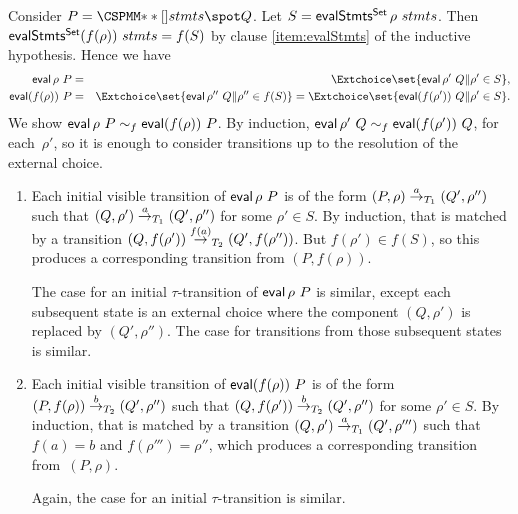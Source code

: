



Consider $P = \M{**[]} stmts \spot Q$.  Let $S = \mathop{\sf evalStmts^{Set}} \rho~stmts$.
Then $\mathop{\sf evalStmts^{Set}} (f(\rho))~stmts = f(S)$ by clause \ref{item:evalStmts} of
the inductive hypothesis.  Hence we have
%
\begin{eqnarray*}
\eval \rho~ P & = & 
  \Extchoice \set{\eval \rho' ~ Q \| \rho' \in S}, \\
\eval (f(\rho))~ P & = & 
  \Extchoice \set{\eval \rho'' ~ Q \| \rho'' \in f(S)} 
   =  \Extchoice \set{\eval (f(\rho'))~ Q \| \rho' \in S} .
\end{eqnarray*}
%
We show $\mathop{\sf eval} \rho~ P \sim_f \mathop{\sf eval} (f(\rho))~ P$.  By
induction, $\mathop{\sf eval} \rho' ~ Q \sim_f \mathop{\sf eval} (f(\rho'))~ Q$, for each~$\rho'$,
so it is enough to consider transitions up to the resolution of the external
choice. 
%
\begin{enumerate}
\item
Each initial visible transition of $\mathop{\sf eval} \rho~ P$ is of the form
$(P,\rho) \stackrel{a}{\rightarrow}_{T_1} (Q',\rho'')$ such that $(Q,\rho') \stackrel{a}{\rightarrow}_{T_1}
(Q',\rho'')$ for some $\rho' \in S$.  By induction, that is matched by a
transition $(Q,f(\rho')) \stackrel{f(a)}{\rightarrow}_{T_2} (Q',f(\rho''))$.  But
$f(\rho') \in f(S)$, so this produces a corresponding transition from
$(P,f(\rho))$.

The case for an initial $\tau$-transition of $\mathop{\sf eval} \rho~ P$ is similar,
except each subsequent state is an external choice where the component
$(Q,\rho')$ is replaced by $(Q',\rho'')$.  The case for transitions from those
subsequent states is similar.

\item
Each initial visible transition of $\mathop{\sf eval} (f(\rho))~ P$ is of the form
$(P,f(\rho)) \stackrel{b}{\rightarrow}_{T_2} (Q',\rho'')$ such that
$(Q,f(\rho')) \stackrel{b}{\rightarrow}_{T_2} (Q',\rho'')$ for some $\rho' \in S$.  By
induction, that is matched by a transition $(Q,\rho') \stackrel{a}{\rightarrow}_{T_1}
(Q',\rho''')$ such that $f(a) = b$ and $f(\rho''') = \rho''$, which produces a
corresponding transition from~$(P,\rho)$.

Again, the case for an initial $\tau$-transition is similar. 
\end{enumerate}

